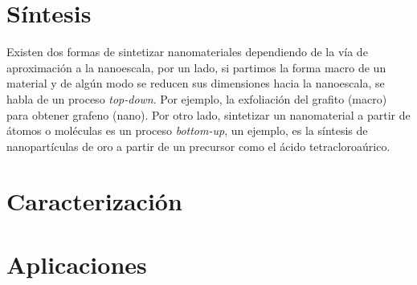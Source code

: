 \section{Síntesis}
Existen dos formas de sintetizar nanomateriales dependiendo de la vía de aproximación a la nanoescala, por un lado, si partimos la forma macro de un material y de algún modo se reducen sus dimensiones hacia la nanoescala, se habla de un proceso \textit{top-down}. Por ejemplo, la exfoliación del grafito (macro) para obtener grafeno (nano).  Por otro lado, sintetizar un nanomaterial a partir de átomos o moléculas es un proceso \textit{bottom-up}, un ejemplo, es la síntesis de nanopartículas de oro a partir de un precursor como el ácido tetracloroaúrico.

\section{Caracterización}

\section{Aplicaciones}
